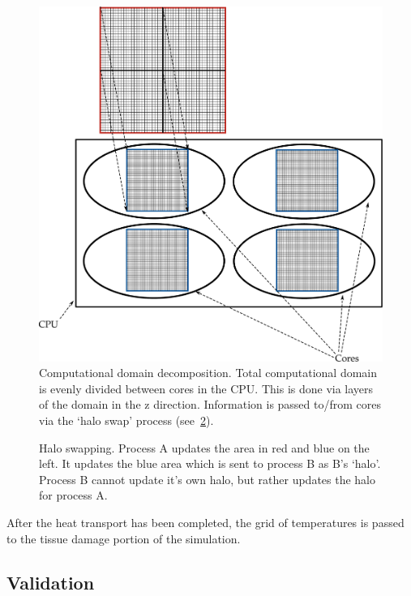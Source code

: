 \begin{figure}
\vspace{-45pt}
\centering
\includegraphics[scale=.35]{./ablation/images/grid-decomp.pdf}
\caption{Computational domain decomposition. Total computational domain is evenly divided between cores in the CPU. This is done via layers of the domain in the z direction. Information is passed to/from cores via the `halo swap' process (see~\cref{fig:haloswap}).}
\label{fig:griddecomp}
\vspace{-10pt}
\end{figure}

\begin{figure}
\centering
\def\svgwidth{350pt}

\caption{Halo swapping. Process A updates the area in red and blue on the left. It updates the blue area which is sent to process B as B's `halo'. Process B cannot update it's own halo, but rather updates the halo for process A.}
\label{fig:haloswap}
\end{figure}


After the heat transport has been completed, the grid of temperatures is passed to the tissue damage portion of the simulation.
\newpage
\subsection{Validation}%



